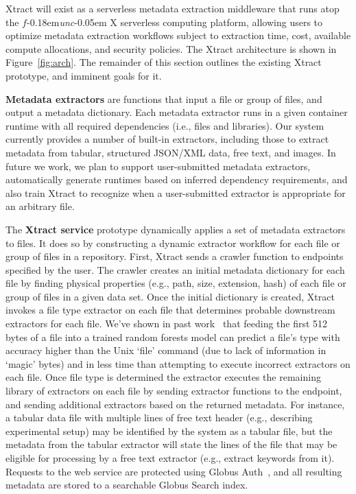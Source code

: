 \documentclass[sigconf, 9pt]{acmart}
\newcommand{\name}{Xtract}
\newcommand{\funcx}{$f$\kern-0.18em\emph{unc}\kern-0.05em X}
\begin{document}
\name{} will exist as a serverless metadata extraction middleware that runs atop the \funcx{} serverless 
computing platform, allowing users to optimize metadata extraction workflows subject to 
extraction time, cost, available compute allocations, and security policies.
The \name{} architecture is shown in Figure~\ref{fig:arch}.
The remainder 
of this section outlines the existing \name{} prototype, and imminent goals for it. 

\textbf{Metadata extractors} are functions that input a file or group of files, and output a metadata dictionary. 
Each metadata extractor runs in a given container runtime with all required dependencies (i.e., files and 
libraries).  Our system currently provides a number of built-in extractors, including
those to extract metadata from tabular, structured JSON/XML data, free text, and images. In future we work, 
we plan to support user-submitted metadata extractors, automatically generate runtimes based on inferred 
dependency requirements, and also train \name{} to recognize when a user-submitted extractor 
is appropriate for an arbitrary file. 

The \textbf{\name{} service} prototype dynamically applies a set of metadata extractors to files. 
It does so by constructing a dynamic extractor workflow for each file 
or group of files in a repository.  
First, \name{} sends a crawler function to endpoints specified by the user.  The crawler creates an 
initial metadata dictionary for each file by finding physical properties (e.g., path, size, extension, hash) of each file or group of files
in a given data set.  Once the initial dictionary is created, \name{} invokes a file type extractor on each file that determines probable downstream extractors for each file. We've shown in past work~\cite{skluzacek2018skluma} that feeding the first 512 bytes of a file into 
a trained random forests model can predict a file's type with accuracy higher than the Unix `file' command (due to lack of information in `magic' bytes) and in less time
than attempting to execute incorrect extractors on each file. Once file type is determined the extractor executes the remaining library of extractors 
on each file by sending extractor functions to the endpoint, and sending additional extractors based on the returned metadata.  For instance, 
a tabular data file with multiple lines of free text header (e.g., describing experimental setup) may be identified by the system as a tabular file, but 
the metadata from the tabular 
extractor will state the lines of the file that may be eligible for processing by a free text extractor (e.g., extract keywords from it).
Requests to the web service are protected using Globus Auth~\cite{tuecke2016globus}, and all resulting metadata are stored to a searchable Globus Search index. 
\end{document}
